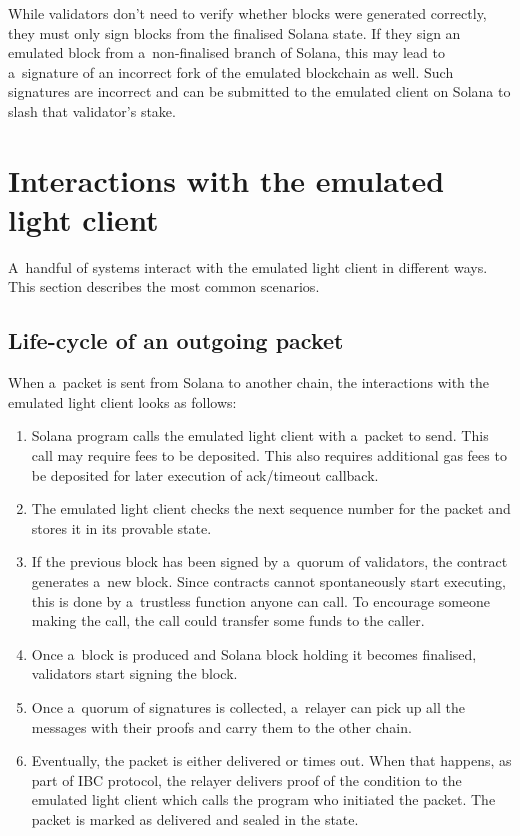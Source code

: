 \documentclass[sigplan,screen,authorversion]{acmart}
\begin{document}
While validators don’t need to verify whether blocks were generated
correctly, they must only sign blocks from the finalised Solana state.
If they sign an emulated block from a~non-finalised branch of Solana,
this may lead to a~signature of an incorrect fork of the emulated
blockchain as well.  Such signatures are incorrect and can be
submitted to the emulated client on Solana to slash that validator’s
stake.

\section{Interactions with the emulated light client}

A~handful of systems interact with the emulated light client in
different ways.  This section describes the most common scenarios.

\subsection{Life-cycle of an outgoing packet}

When a~packet is sent from Solana to another chain, the interactions
with the emulated light client looks as follows:

\begin{enumerate}
\item Solana program calls the emulated light client with a~packet to
  send.  This call may require fees to be deposited.  This also
  requires additional gas fees to be deposited for later execution of
  ack/timeout callback.
\item The emulated light client checks the next sequence number for
  the packet and stores it in its provable state.
\item If the previous block has been signed by a~quorum of validators,
  the contract generates a~new block.  Since contracts cannot
  spontaneously start executing, this is done by a~trustless function
  anyone can call.  To encourage someone making the call, the call
  could transfer some funds to the caller.
\item Once a~block is produced and Solana block holding it becomes
  finalised, validators start signing the block.
\item Once a~quorum of signatures is collected, a~relayer can pick up
  all the messages with their proofs and carry them to the other
  chain.
\item Eventually, the packet is either delivered or times out.  When
  that happens, as part of IBC protocol, the relayer delivers proof of
  the condition to the emulated light client which calls the program
  who initiated the packet.  The packet is marked as delivered and
  sealed in the state.
\end{enumerate}
\end{document}
